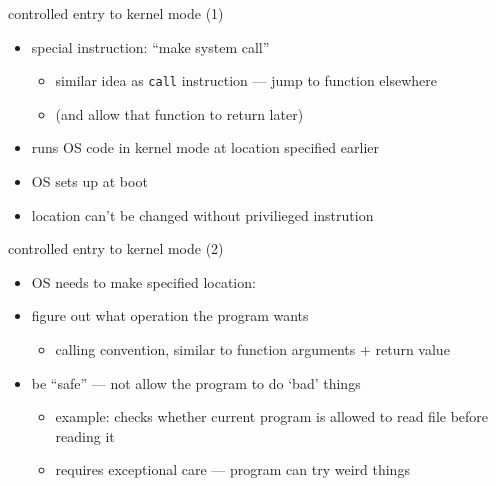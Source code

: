 

\begin{frame}{controlled entry to kernel mode (1)}
\begin{itemize}
\item special instruction: ``make system call''
    \begin{itemize}
    \item similar idea as \texttt{call} instruction --- jump to function elsewhere
    \item (and allow that function to return later)
    \end{itemize}
\vspace{.5cm}
\item runs OS code in kernel mode at location specified earlier 
\item OS sets up at boot
\item location can't be changed without privilieged instrution
\end{itemize}
\end{frame}

\begin{frame}{controlled entry to kernel mode (2)}
\begin{itemize}
\item OS needs to make specified location:
\vspace{.5cm}
\item figure out what operation the program wants
    \begin{itemize}
    \item calling convention, similar to function arguments + return value
    \end{itemize}
\item be ``safe'' --- not allow the program to do `bad' things
    \begin{itemize}
    \item example: checks whether current program is allowed to read file before reading it
    \item requires exceptional care --- program can try weird things
    \end{itemize}
\end{itemize}
\end{frame}
